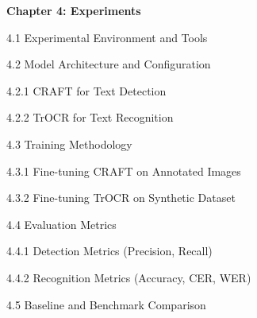 \begin{adjustwidth}{0.2cm}{0.2cm}
    \vspace{0.5cm}
    {\large \textbf{Chapter 4: Experiments}\dotfill\pageref{ch:experiments}\par}
    {\large 4.1 Experimental Environment and Tools\dotfill\pageref{sec:environment}\par}
    {\large 4.2 Model Architecture and Configuration\dotfill\pageref{sec:architecture}\par}
    {\large \hspace{1cm}4.2.1 CRAFT for Text Detection\dotfill\pageref{subsec:craft}\par}
    {\large \hspace{1cm}4.2.2 TrOCR for Text Recognition\dotfill\pageref{subsec:trocr}\par}
    {\large 4.3 Training Methodology\dotfill\pageref{sec:training}\par}
    {\large \hspace{1cm}4.3.1 Fine-tuning CRAFT on Annotated Images\dotfill\pageref{subsec:craft-training}\par}
    {\large \hspace{1cm}4.3.2 Fine-tuning TrOCR on Synthetic Dataset\dotfill\pageref{subsec:trocr-training}\par}
    {\large 4.4 Evaluation Metrics\dotfill\pageref{sec:metrics}\par}
    {\large \hspace{1cm}4.4.1 Detection Metrics (Precision, Recall)\dotfill\pageref{subsec:detection-metrics}\par}
    {\large \hspace{1cm}4.4.2 Recognition Metrics (Accuracy, CER, WER)\dotfill\pageref{subsec:recognition-metrics}\par}
    {\large 4.5 Baseline and Benchmark Comparison\dotfill\pageref{sec:benchmark}\par}


\end{adjustwidth}
